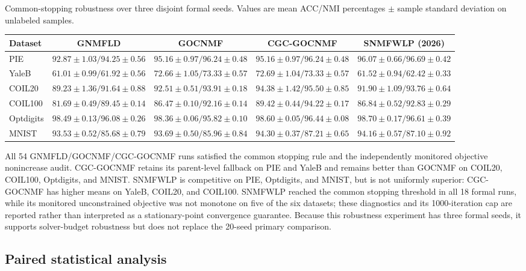 \documentclass[11pt]{article}
\newenvironment{widetable}
  {\begin{strip}\centering\captionsetup{type=table}}
  {\end{strip}}
\theoremstyle{remark}
\begin{document}
\begin{widetable}
\centering
\caption{Common-stopping robustness over three disjoint formal seeds. Values are mean ACC/NMI percentages $\pm$ sample standard deviation on unlabeled samples.}
\label{tab:common_stop}
\small
\setlength{\tabcolsep}{5.0pt}
\begin{tabular}{lcccc}
\toprule
Dataset & GNMFLD & GOCNMF & CGC-GOCNMF & SNMFWLP (2026) \\
\midrule
PIE & $92.87\pm1.03/94.25\pm0.56$ & $95.16\pm0.97/96.24\pm0.48$ & $95.16\pm0.97/96.24\pm0.48$ & $96.07\pm0.66/96.69\pm0.42$ \\
YaleB & $61.01\pm0.99/61.92\pm0.56$ & $72.66\pm1.05/73.33\pm0.57$ & $72.69\pm1.04/73.33\pm0.57$ & $61.52\pm0.94/62.42\pm0.33$ \\
COIL20 & $89.23\pm1.36/91.64\pm0.88$ & $92.51\pm0.51/93.91\pm0.18$ & $94.38\pm1.42/95.50\pm0.85$ & $91.90\pm1.09/93.76\pm0.64$ \\
COIL100 & $81.69\pm0.49/89.45\pm0.14$ & $86.47\pm0.10/92.16\pm0.14$ & $89.42\pm0.44/94.22\pm0.17$ & $86.84\pm0.52/92.83\pm0.29$ \\
Optdigits & $98.49\pm0.13/96.08\pm0.26$ & $98.36\pm0.06/95.82\pm0.10$ & $98.60\pm0.05/96.44\pm0.08$ & $98.70\pm0.17/96.61\pm0.39$ \\
MNIST & $93.53\pm0.52/85.68\pm0.79$ & $93.69\pm0.50/85.96\pm0.84$ & $94.30\pm0.37/87.21\pm0.65$ & $94.16\pm0.57/87.10\pm0.92$ \\
\bottomrule
\end{tabular}
\end{widetable}

All 54 GNMFLD/GOCNMF/CGC-GOCNMF runs satisfied the common stopping rule and the independently monitored objective nonincrease audit. CGC-GOCNMF retains its parent-level fallback on PIE and YaleB and remains better than GOCNMF on COIL20, COIL100, Optdigits, and MNIST. SNMFWLP is competitive on PIE, Optdigits, and MNIST, but is not uniformly superior: CGC-GOCNMF has higher means on YaleB, COIL20, and COIL100. SNMFWLP reached the common stopping threshold in all 18 formal runs, while its monitored unconstrained objective was not monotone on five of the six datasets; these diagnostics and its 1000-iteration cap are reported rather than interpreted as a stationary-point convergence guarantee. Because this robustness experiment has three formal seeds, it supports solver-budget robustness but does not replace the 20-seed primary comparison.

\subsection{Paired statistical analysis}
\end{document}
